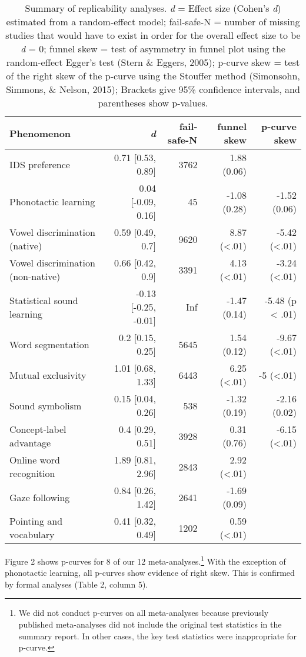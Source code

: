 \documentclass[english,floatsintext,man]{apa6}
\begin{document}
\begin{table}[t]
\footnotesize
\begin{tabular}{lrrrr}
\toprule
\textbf{Phenomenon} & \textbf{\textit{d}} & \textbf{fail-safe-N} & \textbf{funnel skew} & \textbf{p-curve skew}\\
\midrule
IDS preference & 0.71 [0.53, 0.89] & 3762 & 1.88 (0.06) & \\
Phonotactic learning & 0.04 [-0.09, 0.16] & 45 & -1.08 (0.28) & -1.52 (0.06)\\
Vowel discrimination (native) & 0.59 [0.49, 0.7] & 9620 & 8.87 (<.01) & -5.42 (<.01)\\
Vowel discrimination (non-native) & 0.66 [0.42, 0.9] & 3391 & 4.13 (<.01) & -3.24 (<.01)\\
Statistical sound learning & -0.13 [-0.25, -0.01] & Inf & -1.47 (0.14) & -5.48 (p < .01)\\
Word segmentation & 0.2 [0.15, 0.25] & 5645 & 1.54 (0.12) & -9.67 (<.01)\\
Mutual exclusivity & 1.01 [0.68, 1.33] & 6443 & 6.25 (<.01) & -5 (<.01)\\
Sound symbolism & 0.15 [0.04, 0.26] & 538 & -1.32 (0.19) & -2.16 (0.02)\\
Concept-label advantage & 0.4 [0.29, 0.51] & 3928 & 0.31 (0.76) & -6.15 (<.01)\\
Online word recognition & 1.89 [0.81, 2.96] & 2843 & 2.92 (<.01) & \\
Gaze following & 0.84 [0.26, 1.42] & 2641 & -1.69 (0.09) & \\
Pointing and vocabulary & 0.41 [0.32, 0.49] & 1202 & 0.59 (<.01) & \\
\bottomrule
\end{tabular}
\caption{Summary of replicability analyses. \textit{d} = Effect size (Cohen's {\it d}) estimated from a random-effect model; fail-safe-N = number of missing studies that would have to exist in order for the overall effect size to be {\it d} = 0; funnel skew = test of asymmetry in funnel plot using the random-effect Egger's test (Stern \& Eggers, 2005); p-curve skew = test of the right skew of the p-curve using the Stouffer method (Simonsohn, Simmons, \& Nelson, 2015); Brackets give 95\% confidence intervals, and parentheses show p-values.}
\end{table}

Figure 2 shows p-curves for 8 of our 12
meta-analyses.\footnote{We did not conduct p-curves on all meta-analyses because previously published meta-analyses did not include the original test statistics in the summary report. In other cases, the key test statistics were inappropriate for p-curve.}
With the exception of phonotactic learning, all p-curves show evidence
of right skew. This is confirmed by formal analyses (Table 2, column 5).
\end{document}
